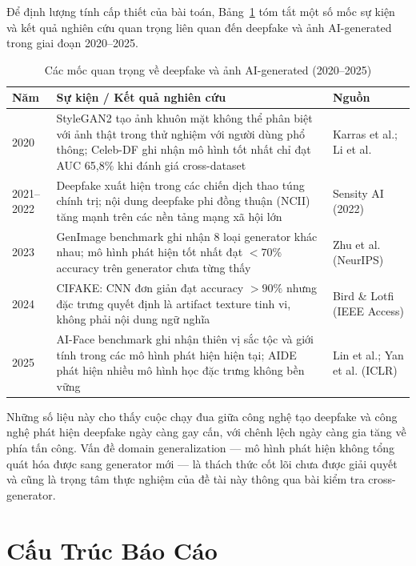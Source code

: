 Để định lượng tính cấp thiết của bài toán, Bảng~\ref{tab:deepfake_timeline} tóm tắt một số mốc sự kiện và kết quả nghiên cứu quan trọng liên quan đến deepfake và ảnh AI-generated trong giai đoạn 2020--2025.

\begin{table}[H]
  \centering
  \caption{Các mốc quan trọng về deepfake và ảnh AI-generated (2020--2025)}
  \label{tab:deepfake_timeline}
  \begin{tabularx}{\linewidth}{lXl}
    \toprule
    \textbf{Năm} & \textbf{Sự kiện / Kết quả nghiên cứu} & \textbf{Nguồn} \\
    \midrule
    2020 & StyleGAN2 tạo ảnh khuôn mặt không thể phân biệt với ảnh thật trong thử nghiệm với người dùng phổ thông; Celeb-DF ghi nhận mô hình tốt nhất chỉ đạt AUC 65,8\% khi đánh giá cross-dataset & Karras et al.; Li et al. \\
    2021--2022 & Deepfake xuất hiện trong các chiến dịch thao túng chính trị; nội dung deepfake phi đồng thuận (NCII) tăng mạnh trên các nền tảng mạng xã hội lớn & Sensity AI (2022) \\
    2023 & GenImage benchmark ghi nhận 8 loại generator khác nhau; mô hình phát hiện tốt nhất đạt $< 70\%$ accuracy trên generator chưa từng thấy & Zhu et al. (NeurIPS) \\
    2024 & CIFAKE: CNN đơn giản đạt accuracy $> 90\%$ nhưng đặc trưng quyết định là artifact texture tinh vi, không phải nội dung ngữ nghĩa & Bird \& Lotfi (IEEE Access) \\
    2025 & AI-Face benchmark ghi nhận thiên vị sắc tộc và giới tính trong các mô hình phát hiện hiện tại; AIDE phát hiện nhiều mô hình học đặc trưng không bền vững & Lin et al.; Yan et al. (ICLR) \\
    \bottomrule
  \end{tabularx}
\end{table}

Những số liệu này cho thấy cuộc chạy đua giữa công nghệ tạo deepfake và công nghệ phát hiện deepfake ngày càng gay cấn, với chênh lệch ngày càng gia tăng về phía tấn công. Vấn đề domain generalization --- mô hình phát hiện không tổng quát hóa được sang generator mới --- là thách thức cốt lõi chưa được giải quyết và cũng là trọng tâm thực nghiệm của đề tài này thông qua bài kiểm tra cross-generator.

\section{Cấu Trúc Báo Cáo}

